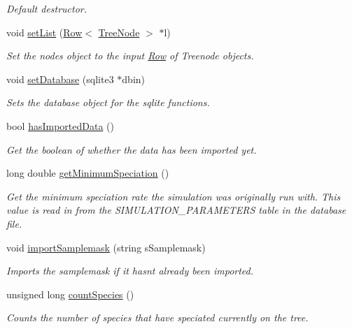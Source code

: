 \begin{DoxyCompactItemize}
\begin{DoxyCompactList}\small\item\em Default destructor. \end{DoxyCompactList}\item 
void \hyperlink{class_community_a710a402dffa1b85183dd7f4a5a44f988}{set\+List} (\hyperlink{class_row}{Row}$<$ \hyperlink{class_tree_node}{Tree\+Node} $>$ $\ast$l)
\begin{DoxyCompactList}\small\item\em Set the nodes object to the input \hyperlink{class_row}{Row} of Treenode objects. \end{DoxyCompactList}\item 
void \hyperlink{class_community_a6fe2fdb93911f403dd879ca2847e4933}{set\+Database} (sqlite3 $\ast$dbin)
\begin{DoxyCompactList}\small\item\em Sets the database object for the sqlite functions. \end{DoxyCompactList}\item 
bool \hyperlink{class_community_a045f762ca30c3a20e8ef5911a4982160}{has\+Imported\+Data} ()
\begin{DoxyCompactList}\small\item\em Get the boolean of whether the data has been imported yet. \end{DoxyCompactList}\item 
long double \hyperlink{class_community_a4e5dea65183810c3b27441736eca825a}{get\+Minimum\+Speciation} ()
\begin{DoxyCompactList}\small\item\em Get the minimum speciation rate the simulation was originally run with. This value is read in from the S\+I\+M\+U\+L\+A\+T\+I\+O\+N\+\_\+\+P\+A\+R\+A\+M\+E\+T\+E\+RS table in the database file. \end{DoxyCompactList}\item 
void \hyperlink{class_community_a01a137383e1e23f2191d63f16513a00a}{import\+Samplemask} (string s\+Samplemask)
\begin{DoxyCompactList}\small\item\em Imports the samplemask if it hasn\textquotesingle{}t already been imported. \end{DoxyCompactList}\item 
unsigned long \hyperlink{class_community_a07970398c04e7c31ceda695c2860e20f}{count\+Species} ()
\begin{DoxyCompactList}\small\item\em Counts the number of species that have speciated currently on the tree. \end{DoxyCompactList}\item 

\end{DoxyCompactItemize}
